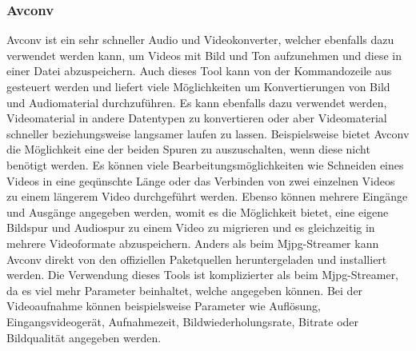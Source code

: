 \subsubsection{Avconv}
Avconv ist ein sehr schneller Audio und Videokonverter, welcher ebenfalls dazu verwendet werden kann, um Videos mit Bild und Ton aufzunehmen und diese in einer Datei abzuspeichern. Auch dieses Tool kann von der Kommandozeile aus gesteuert werden und liefert viele Möglichkeiten um Konvertierungen von Bild und Audiomaterial durchzuführen. Es kann ebenfalls dazu verwendet werden, Videomaterial in andere Datentypen zu konvertieren oder aber Videomaterial schneller beziehungsweise langsamer laufen zu lassen. Beispielsweise bietet Avconv die Möglichkeit eine der beiden Spuren zu auszuschalten, wenn diese nicht benötigt werden. Es können viele Bearbeitungsmöglichkeiten wie Schneiden eines Videos in eine geqünschte Länge oder das Verbinden von zwei einzelnen Videos zu einem längerem Video durchgeführt werden. Ebenso können mehrere Eingänge und Ausgänge angegeben werden, womit es die Möglichkeit bietet, eine eigene Bildspur und Audiospur zu einem Video zu migrieren und es gleichzeitig in mehrere Videoformate abzuspeichern. Anders als beim Mjpg-Streamer kann Avconv direkt von den offiziellen Paketquellen heruntergeladen und installiert werden. Die Verwendung dieses Tools ist komplizierter als beim Mjpg-Streamer, da es viel mehr Parameter beinhaltet, welche angegeben können. Bei der Videoaufnahme können beispielsweise Parameter wie Auflösung, Eingangsvideogerät, Aufnahmezeit, Bildwiederholungsrate, Bitrate oder Bildqualität angegeben werden. \cite{Avconv}

